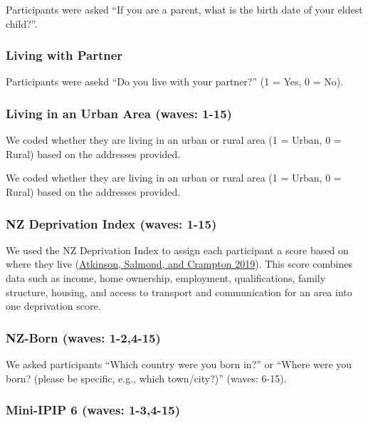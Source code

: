 \documentclass[
  singlecolumn]{report}
\begin{document}
Participants were asked ``If you are a parent, what is the birth date of
your eldest child?''.

\hypertarget{living-with-partner}{%
\subsubsection{Living with Partner}\label{living-with-partner}}

Participants were asekd ``Do you live with your partner?'' (1 = Yes, 0 =
No).

\hypertarget{living-in-an-urban-area-waves-1-15}{%
\subsubsection{Living in an Urban Area (waves:
1-15)}\label{living-in-an-urban-area-waves-1-15}}

We coded whether they are living in an urban or rural area (1 = Urban, 0
= Rural) based on the addresses provided.

We coded whether they are living in an urban or rural area (1 = Urban, 0
= Rural) based on the addresses provided.

\hypertarget{nz-deprivation-index-waves-1-15}{%
\subsubsection{NZ Deprivation Index (waves:
1-15)}\label{nz-deprivation-index-waves-1-15}}

We used the NZ Deprivation Index to assign each participant a score
based on where they live (\protect\hyperlink{ref-atkinson2019}{Atkinson,
Salmond, and Crampton 2019}). This score combines data such as income,
home ownership, employment, qualifications, family structure, housing,
and access to transport and communication for an area into one
deprivation score.

\hypertarget{nz-born-waves-1-24-15}{%
\subsubsection{NZ-Born (waves: 1-2,4-15)}\label{nz-born-waves-1-24-15}}

We asked participants ``Which country were you born in?'' or ``Where
were you born? (please be specific, e.g., which town/city?)'' (waves:
6-15).

\hypertarget{mini-ipip-6-waves-1-34-15}{%
\subsubsection{Mini-IPIP 6 (waves:
1-3,4-15)}\label{mini-ipip-6-waves-1-34-15}}
\end{document}
